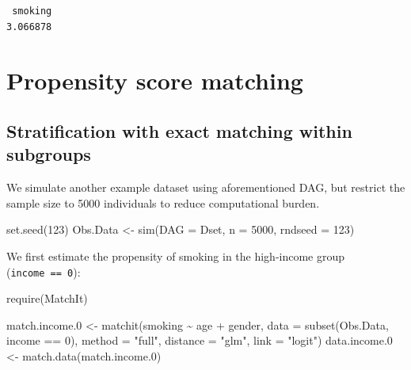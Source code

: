 \documentclass[
  letterpaper,
  DIV=11,
  numbers=noendperiod]{scrreprt}
\newenvironment{Shaded}{\begin{snugshade}}{\end{snugshade}}
\newcommand{\AttributeTok}[1]{\textcolor[rgb]{0.40,0.45,0.13}{#1}}
\newcommand{\DecValTok}[1]{\textcolor[rgb]{0.68,0.00,0.00}{#1}}
\newcommand{\FloatTok}[1]{\textcolor[rgb]{0.68,0.00,0.00}{#1}}
\newcommand{\FunctionTok}[1]{\textcolor[rgb]{0.28,0.35,0.67}{#1}}
\newcommand{\NormalTok}[1]{\textcolor[rgb]{0.00,0.23,0.31}{#1}}
\newcommand{\OtherTok}[1]{\textcolor[rgb]{0.00,0.23,0.31}{#1}}
\newcommand{\SpecialCharTok}[1]{\textcolor[rgb]{0.37,0.37,0.37}{#1}}
\newcommand{\StringTok}[1]{\textcolor[rgb]{0.13,0.47,0.30}{#1}}
\begin{document}
\begin{verbatim}
 smoking 
3.066878 
\end{verbatim}

\hypertarget{propensity-score-matching-1}{%
\section{Propensity score matching}\label{propensity-score-matching-1}}

\hypertarget{stratification-with-exact-matching-within-subgroups}{%
\subsection{Stratification with exact matching within
subgroups}\label{stratification-with-exact-matching-within-subgroups}}

We simulate another example dataset using aforementioned DAG, but
restrict the sample size to 5000 individuals to reduce computational
burden.

\begin{Shaded}
\begin{Highlighting}[]
\FunctionTok{set.seed}\NormalTok{(}\DecValTok{123}\NormalTok{)}
\NormalTok{Obs.Data }\OtherTok{\textless{}{-}} \FunctionTok{sim}\NormalTok{(}\AttributeTok{DAG =}\NormalTok{ Dset, }\AttributeTok{n =} \DecValTok{5000}\NormalTok{, }\AttributeTok{rndseed =} \DecValTok{123}\NormalTok{)}
\end{Highlighting}
\end{Shaded}

We first estimate the propensity of smoking in the high-income group
(\texttt{income\ ==\ 0}):

\begin{Shaded}
\begin{Highlighting}[]
\FunctionTok{require}\NormalTok{(MatchIt)}

\NormalTok{match.income}\FloatTok{.0} \OtherTok{\textless{}{-}} \FunctionTok{matchit}\NormalTok{(smoking }\SpecialCharTok{\textasciitilde{}}\NormalTok{ age }\SpecialCharTok{+}\NormalTok{ gender, }
                          \AttributeTok{data =} \FunctionTok{subset}\NormalTok{(Obs.Data, income }\SpecialCharTok{==} \DecValTok{0}\NormalTok{),}
                          \AttributeTok{method =} \StringTok{"full"}\NormalTok{, }\AttributeTok{distance =} \StringTok{"glm"}\NormalTok{, }\AttributeTok{link =} \StringTok{"logit"}\NormalTok{)}
\NormalTok{data.income}\FloatTok{.0} \OtherTok{\textless{}{-}} \FunctionTok{match.data}\NormalTok{(match.income}\FloatTok{.0}\NormalTok{)}
\end{Highlighting}
\end{Shaded}
\end{document}

